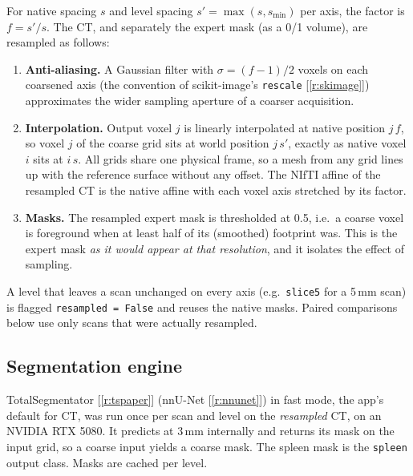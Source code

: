 \documentclass[10pt,a4paper]{article}
\newcommand{\lvl}[1]{\texttt{#1}}
\newcommand{\rf}[1]{[\ref{#1}]}
\begin{document}
For native spacing $s$ and level spacing $s'=\max(s, s_{\min})$ per axis, the factor is $f=s'/s$. The CT, and separately the expert mask (as a 0/1 volume), are resampled as follows:
\begin{enumerate}
\item \textbf{Anti-aliasing.} A Gaussian filter with $\sigma=(f-1)/2$ voxels on each coarsened axis (the convention of scikit-image's \texttt{rescale} \rf{r:skimage}) approximates the wider sampling aperture of a coarser acquisition.
\item \textbf{Interpolation.} Output voxel $j$ is linearly interpolated at native position $j\,f$, so voxel $j$ of the coarse grid sits at world position $j\,s'$, exactly as native voxel $i$ sits at $i\,s$. All grids share one physical frame, so a mesh from any grid lines up with the reference surface without any offset. The NIfTI affine of the resampled CT is the native affine with each voxel axis stretched by its factor.
\item \textbf{Masks.} The resampled expert mask is thresholded at 0.5, i.e.\ a coarse voxel is foreground when at least half of its (smoothed) footprint was. This is the expert mask \emph{as it would appear at that resolution}, and it isolates the effect of sampling.
\end{enumerate}
A level that leaves a scan unchanged on every axis (e.g.\ \lvl{slice5} for a 5\,mm scan) is flagged \texttt{resampled = False} and reuses the native masks. Paired comparisons below use only scans that were actually resampled.

\subsection{Segmentation engine}
TotalSegmentator \rf{r:tspaper} (nnU-Net \rf{r:nnunet}) in fast mode, the app's default for CT, was run once per scan and level on the \emph{resampled} CT, on an NVIDIA RTX 5080. It predicts at 3\,mm internally and returns its mask on the input grid, so a coarse input yields a coarse mask. The spleen mask is the \texttt{spleen} output class. Masks are cached per level.
\end{document}

